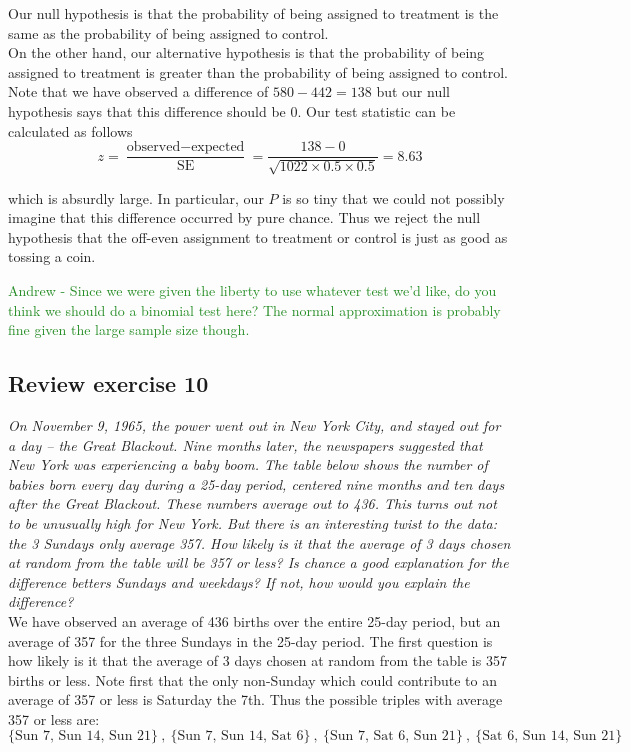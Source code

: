 \documentclass[11pt]{article}
\begin{document}
\noindent Our null hypothesis is that the probability of being assigned to treatment is the same as the probability of being assigned to control. \\

\noindent On the other hand, our alternative hypothesis is that the probability of being assigned to treatment is greater than the probability of being assigned to control. Note that we have observed a difference of $580 - 442 = 138$ but our null hypothesis says that this difference should be 0. Our test statistic can be calculated as follows
$$z = \frac{\text{observed} - \text{expected}}{\text{SE}} = \frac{138 - 0}{\sqrt{1022 \times 0.5 \times 0.5}} = 8.63 $$

\noindent which is absurdly large. In particular, our $P$ is so tiny that we could not possibly imagine that this difference occurred by pure chance. Thus we reject the null hypothesis that the off-even assignment to treatment or control is just as good as tossing a coin.

\textcolor{ForestGreen}{Andrew - Since we were given the liberty to use whatever test we'd like, do you think we should do a binomial test here? The normal approximation is probably fine given the large sample size though.} %

\subsection*{Review exercise 10} %
\noindent \emph{On November 9, 1965, the power went out in New York City, and stayed out for a day -- the Great Blackout. Nine months later, the newspapers suggested that New York was experiencing a baby boom. The table below shows the number of babies born every day during a 25-day period, centered nine months and ten days after the Great Blackout. These numbers average out to 436. This turns out not to be unusually high for New York. But there is an interesting twist to the data: the 3 Sundays only average 357. How likely is it that the average of 3 days chosen at random from the table will be 357 or less? Is chance a good explanation for the difference betters Sundays and weekdays? If not, how would you explain the difference?}\\

\noindent We have observed an average of 436 births over the entire 25-day period, but an average of 357 for the three Sundays in the 25-day period. The first question is how likely is it that the average of 3 days chosen at random from the table is 357 births or less. Note first that the only non-Sunday which could contribute to an average of 357 or less is Saturday the 7th. Thus the possible triples with average 357 or less are:
$$\{\text{Sun 7, Sun 14, Sun 21}\}~,~ \{\text{Sun 7, Sun 14, Sat 6}\}~,~ \{\text{Sun 7, Sat 6, Sun 21}\}~,~ \{\text{Sat 6, Sun 14, Sun 21}\}$$
\end{document}
